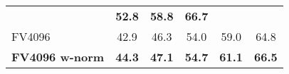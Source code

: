 \begin{tabularx}{0.864\linewidth}{|l|c c c c c|}
														&\textcolor{petr}{\textbf{52.8}}       
														&\textcolor{petr}{\textbf{58.8}}       
														&\textcolor{petr}{\textbf{66.7}} \\
	    \rowcolor{maroon!10}
	    \hline   
	    \textcolor{petr}{FV4096}						&\textcolor{petr}{42.9}     
	    												&\textcolor{petr}{46.3}     
	    												&\textcolor{petr}{54.0}     
	    												&\textcolor{petr}{59.0}    
	    												&\textcolor{petr}{64.8}   \\ 
	    \rowcolor{maroon!10}
	    \textcolor{petr}{\textbf{FV4096 w-norm}}		&\textcolor{petr}{\textbf{44.3}}      
	    												&\textcolor{petr}{\textbf{47.1}}      
	    												&\textcolor{petr}{\textbf{54.7}}      
	    												&\textcolor{petr}{\textbf{61.1}}      
	    												&\textcolor{petr}{\textbf{66.5}} 	\\
	    \hline
\end{tabularx}

